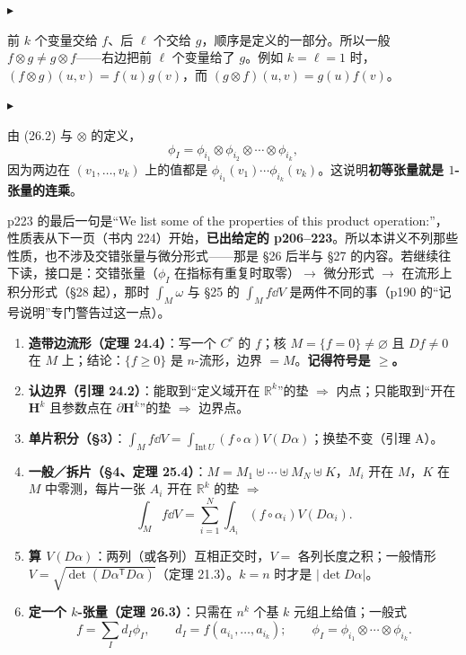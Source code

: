 \documentclass[11pt]{ctexart}
\newcommand{\step}[1]{\par\vspace{3pt}\noindent
  {\color{violet}\small$\blacktriangleright$}\hspace{3pt}{\bfseries\color{violetdeep}#1}\par\vspace{1pt}}
\newcommand{\HH}{\mathbf{H}}
\newcommand{\Vvol}{V}
\begin{document}
\step{读法：$\otimes$ 把槽分成两段}
前 $k$ 个变量交给 $f$、后 $\ell$ 个交给 $g$，顺序是定义的一部分。所以一般 $f\otimes g\ne g\otimes f$——右边把前 $\ell$ 个变量给了 $g$。例如 $k=\ell=1$ 时，$(f\otimes g)(u,v)=f(u)g(v)$，而 $(g\otimes f)(u,v)=g(u)f(v)$。

\step{一条立刻能用的公式}
由 (26.2) 与 $\otimes$ 的定义，
\[ \phi_I=\phi_{i_1}\otimes\phi_{i_2}\otimes\cdots\otimes\phi_{i_k}, \]
因为两边在 $(v_1,\dots,v_k)$ 上的值都是 $\phi_{i_1}(v_1)\cdots\phi_{i_k}(v_k)$。这说明\textbf{初等张量就是 $1$-张量的连乘}。


p223 的最后一句是“We list some of the properties of this product operation:”，性质表从下一页（书内 224）开始，\textbf{已出给定的 p206--223}。所以本讲义不列那些性质，也不涉及交错张量与微分形式——那是 §26 后半与 §27 的内容。若继续往下读，接口是：交错张量（$\phi_I$ 在指标有重复时取零）$\to$ 微分形式 $\to$ 在流形上积分形式（§28 起），那时 $\int_M\omega$ 与 §25 的 $\int_Mf\dd V$ 是两件不同的事（p190 的“记号说明”专门警告过这一点）。


\begin{enumerate}
  \item \textbf{造带边流形（定理 24.4）}：写一个 $C^r$ 的 $f$；核 $M=\{f=0\}\ne\varnothing$ 且 $Df\ne0$ 在 $M$ 上；结论：$\{f\ge0\}$ 是 $n$-流形，边界 $=M$。\textbf{记得符号是 $\ge$。}
  \item \textbf{认边界（引理 24.2）}：能取到“定义域开在 $\mathbb{R}^k$”的垫 $\Rightarrow$ 内点；只能取到“开在 $\HH^k$ 且参数点在 $\partial\HH^k$”的垫 $\Rightarrow$ 边界点。
  \item \textbf{单片积分（§3）}：$\int_Mf\dd V=\int_{\mathrm{Int}\,U}(f\circ\alpha)\Vvol(D\alpha)$；换垫不变（引理 A）。
  \item \textbf{一般／拆片（§4、定理 25.4）}：$M=M_1\uplus\cdots\uplus M_N\uplus K$，$M_i$ 开在 $M$，$K$ 在 $M$ 中零测，每片一张 $A_i$ 开在 $\mathbb{R}^k$ 的垫 $\Rightarrow$
  \[ \int_Mf\dd V=\sum_{i=1}^{N}\int_{A_i}(f\circ\alpha_i)\Vvol(D\alpha_i). \]
  \item \textbf{算 $\Vvol(D\alpha)$}：两列（或各列）互相正交时，$\Vvol=$ 各列长度之积；一般情形 $\Vvol=\sqrt{\det(D\alpha^{\mathsf T}D\alpha)}$（定理 21.3）。$k=n$ 时才是 $|\det D\alpha|$。
  \item \textbf{定一个 $k$-张量（定理 26.3）}：只需在 $n^k$ 个基 $k$ 元组上给值；一般式
  \[ f=\sum_Id_I\phi_I,\qquad d_I=f(a_{i_1},\dots,a_{i_k});\qquad \phi_I=\phi_{i_1}\otimes\cdots\otimes\phi_{i_k}. \]
\end{enumerate}
\end{document}
